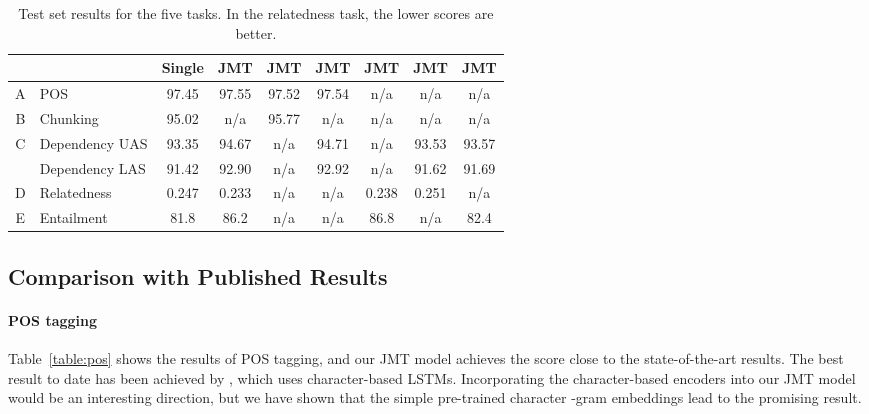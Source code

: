 \documentclass[11pt,a4paper]{article}
\begin{document}
\begin{table*}[t]
  \begin{center}
{\small
	\begin{tabular}{cl|c|c|ccccc}
	  &             & Single   & JMT & JMT  & JMT  & JMT & JMT & JMT \\ \hline
	A  & POS          &  97.45   & 97.55   & 97.52  & 97.54 & n/a & n/a & n/a \\ \hline
	B  & Chunking &     95.02   &  n/a & 95.77  & n/a & n/a & n/a & n/a \\ \hline
	\multirow{2}{*}{C }
	& Dependency UAS&          93.35 & 94.67  & n/a          & 94.71 & n/a & 93.53 &  93.57  \\
	& Dependency LAS&          91.42  & 92.90  & n/a         & 92.92 & n/a & 91.62 &  91.69 \\ \hline
	D  & Relatedness & 0.247 &  0.233 & n/a & n/a & 0.238 & 0.251  & n/a \\ \hline
	E  & Entailment  & 81.8  &  86.2  & n/a & n/a & 86.8 & n/a & 82.4 \\ \hline
  \end{tabular}
}
    \caption{Test set results for the five tasks.
    		 In the relatedness task, the lower scores are better.}
    \label{table:main}
  \end{center}
\end{table*}

\subsection{Comparison with Published Results}

\paragraph{POS tagging}
Table~\ref{table:pos} shows the results of POS tagging, and our JMT model achieves the score close to the state-of-the-art results.
The best result to date has been achieved by \citet{ling2015charlstm}, which uses character-based LSTMs.
Incorporating the character-based encoders into our JMT model would be an interesting direction, but we have shown that the simple pre-trained character -gram embeddings lead to the promising result.
\end{document}
